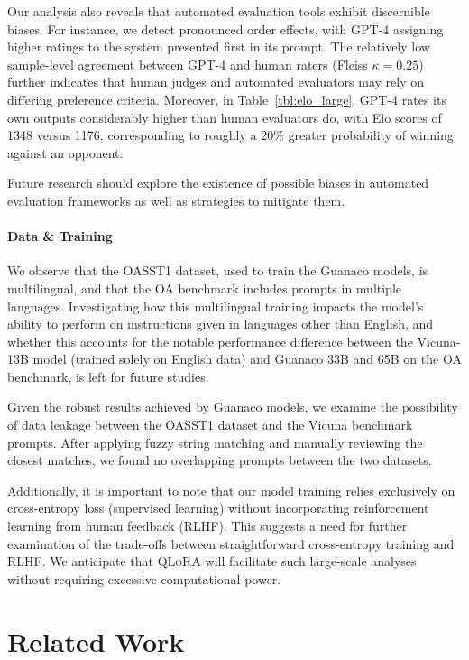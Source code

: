 Our analysis also reveals that automated evaluation tools exhibit discernible biases. For instance, we detect pronounced order effects, with GPT-4 assigning higher ratings to the system presented first in its prompt. The relatively low sample-level agreement between GPT-4 and human raters (Fleiss $\kappa=0.25$) further indicates that human judges and automated evaluators may rely on differing preference criteria. Moreover, in Table~\ref{tbl:elo_large}, GPT-4 rates its own outputs considerably higher than human evaluators do, with Elo scores of 1348 versus 1176, corresponding to roughly a 20\% greater probability of winning against an opponent.

Future research should explore the existence of possible biases in automated evaluation frameworks as well as strategies to mitigate them.

\paragraph{Data \& Training} We observe that the OASST1 dataset, used to train the {Guanaco} models, is multilingual, and that the OA benchmark includes prompts in multiple languages. Investigating how this multilingual training impacts the model's ability to perform on instructions given in languages other than English, and whether this accounts for the notable performance difference between the Vicuna-13B model (trained solely on English data) and {Guanaco} 33B and 65B on the OA benchmark, is left for future studies.

Given the robust results achieved by {Guanaco} models, we examine the possibility of data leakage between the OASST1 dataset and the Vicuna benchmark prompts. After applying fuzzy string matching and manually reviewing the closest matches, we found no overlapping prompts between the two datasets.

Additionally, it is important to note that our model training relies exclusively on cross-entropy loss (supervised learning) without incorporating reinforcement learning from human feedback (RLHF). This suggests a need for further examination of the trade-offs between straightforward cross-entropy training and RLHF. We anticipate that \textsc{QLoRA} will facilitate such large-scale analyses without requiring excessive computational power.

\section{Related Work}


